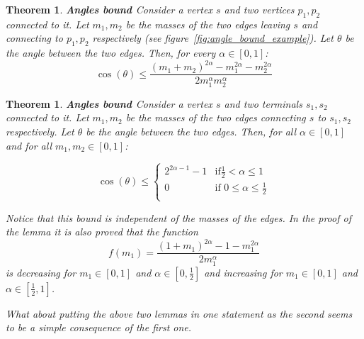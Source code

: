 \documentclass[12pt,a4paper]{article}
\numberwithin{equation}{section}
\theoremstyle{mytheorem}
\newtheorem{theorem}[subsection]{Theorem}
\theoremstyle{myremark}
\theoremstyle{myparagraph}
\begin{document}
    \begin{theorem}
        \textbf{Angles bound \cite[Lemma 12.2]{Bernot}}
        Consider a vertex $s$ and two vertices $p_1, p_2$ connected to it. Let $m_1, m_2$ be the masses of the two edges leaving
        $s$ and connecting to $p_1, p_2$ respectively (see figure~\ref{fig:angle_bound_example}).
        Let $\theta$ be the angle between the two edges. Then, for every $\alpha \in [0,1]$:
        \begin{equation}
            \cos(\theta) \le \frac{(m_1 + m_2) ^ {2\alpha} - m_1^{2\alpha} - m_2^{2\alpha}}{2m_1^\alpha m_2^\alpha}
        \end{equation}
    \end{theorem}

    \begin{theorem}
        \label{lemma:bernot_angles_sum_bound}
        \textbf{Angles bound \cite[Lemma 12.5]{Bernot}}
        Consider a vertex $s$ and two terminals $s_1, s_2$ connected to it. Let $m_1, m_2$ be the masses of the two edges connecting
        $s$ to $s_1, s_2$ respectively. Let $\theta$ be the angle between the two edges.
        Then, for all $\alpha \in [0,1]$ and for all $m_1, m_2 \in [0,1]$:

        \begin{equation}
            \cos(\theta) \le \begin{cases}
                                 2^{2\alpha-1}-1 & \text{if} \frac{1}{2} < \alpha \le 1\\
                                 0 & \text{if 0} \le \alpha \le \frac{1}{2}\\
            \end{cases}
        \end{equation}

        Notice that this bound is independent of the masses of the edges. In the proof of the lemma it is also proved that the function
        \begin{equation}
            f(m_1) = \frac{(1+m_1)^{2\alpha} - 1 - m_1^{2\alpha}}{2m_1^\alpha}
        \end{equation}
        is decreasing for $m_1 \in [0,1]$ and $\alpha \in [0,\frac{1}{2}]$ and increasing for $m_1 \in [0,1]$ and $\alpha \in [\frac{1}{2},1]$.

        What about putting the above two lemmas in one statement as the second seems to be a simple consequence of the first one.

    \end{theorem}
\end{document}
